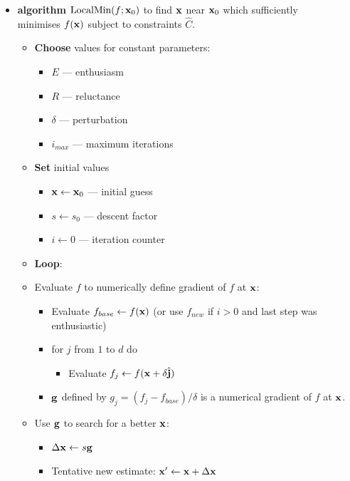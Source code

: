 \begin{itemize}
\item[] {\bf algorithm} $\textup{LocalMin}(f;{\bf x}_0)$ to find ${\bf x}$ near ${\bf x}_0$ which sufficiently\\
  minimises $f(\bf x)$ subject to constraints $\hat{C}$.
  \begin{itemize}
  \item[] {\bf Choose} values for constant parameters:
    \begin{itemize}
    \item[] $E$ --- enthusiasm
    \item[] $R$ --- reluctance
    \item[] $\delta$ --- perturbation
    \item[] $i_{max}$ --- maximum iterations
    \end{itemize}
  \item[] {\bf Set} initial values
    \begin{itemize}
    \item[] ${\bf x} \leftarrow {\bf x}_0$ --- initial guess
    \item[] $s \leftarrow s_0$ --- descent factor
    \item[] $i \leftarrow 0$ --- iteration counter
    \end{itemize}
  \item[] {\bf Loop}:
  \item[] {Evaluate} $f$ to numerically define gradient of $f$ at ${\bf x}$:
    \begin{itemize}
    \item[] Evaluate $f_{base} \leftarrow f({\bf x})$ (or use $f_{new}$ if $i>0$ and last step was enthusiastic) 
    \item[] for $j$ from $1$ to $d$ do
      \begin{itemize}
      \item[] Evaluate $f_j \leftarrow f({\bf x} + \delta \hat {\bf j})$
      \end{itemize}
    \item[] ${\bf g}$ defined by $g_j = (f_j - f_{base})/{\delta}$ is a numerical gradient of $f$ at ${\bf x}$.
    \end{itemize}
  \item[] Use ${\bf g}$ to search for a better ${\bf x}$:
    \begin{itemize}
    \item[] $\Delta{\bf x} \leftarrow s {\bf g}$
    \item[] Tentative new estimate: ${\bf x}' \leftarrow {\bf x} + \Delta{\bf x}$

\end{itemize}
\end{itemize}
\end{itemize}
